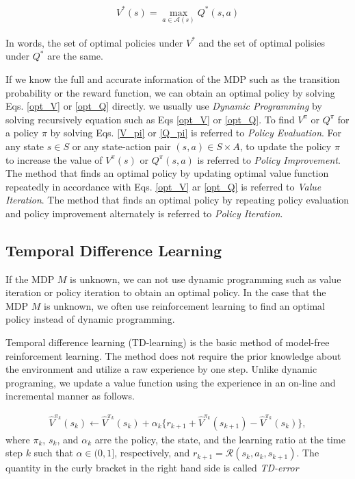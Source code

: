 \begin{align*}
  V^{\ast}(s) = \max_{a \in \mathcal{A}(s)} Q^{\ast}(s,a)
\end{align*}

In words, the set of optimal policies under $V^{\ast}$ and the set of optimal polisies under $Q^{\ast}$ are the same.

If we know the full and accurate information of the MDP such as the transition probability or the reward function, we can obtain an optimal policy by solving Eqs. \ref{opt_V} or \ref{opt_Q} directly. we usually use {\it Dynamic Programming} by solving recursively equation such as Eqs \ref{opt_V} or \ref{opt_Q}. To find $V^{\pi}$ or $Q^{\pi}$ for a policy $\pi$ by solving Eqs. \ref{V_pi} or \ref{Q_pi} is referred to {\it Policy Evaluation}. For any state $s \in S$ or any state-action pair $(s,a) \in S \times A$, to update the policy $\pi$ to increase the value of $V^{\pi}(s)$ or $Q^{\pi}(s,a)$ is referred to {\it Policy Improvement}. The method that finds an optimal policy by updating optimal value function repeatedly in accordance with Eqs. \ref{opt_V} ar \ref{opt_Q} is referred to {\it Value Iteration}. The method that finds an optimal policy by repeating policy evaluation and policy improvement alternately is referred to {\it Policy Iteration}.

\subsection{Temporal Difference Learning}

If the MDP $M$ is unknown, we can not use dynamic programming such as value iteration or policy iteration to obtain an optimal policy. In the case that the MDP $M$ is unknown, we often use   reinforcement learning to find an optimal policy instead of dynamic programming.

Temporal difference learning (TD-learning) is the basic method of model-free reinforcement learning. The method does not require the prior knowledge about the environment and utilize a raw experience by one step. Unlike dynamic programing, we update a value function using the experience in an on-line and incremental manner as follows.

\begin{align}
  \hat{V}^{\pi_k}(s_k) \leftarrow \hat{V}^{\pi_k}(s_k) + \alpha_k \{ r_{k+1} + \hat{V}^{\pi_k}(s_{k+1}) - \hat{V}^{\pi_k}(s_k) \},
\end{align}
where $\pi_k$, $s_k$, and $\alpha_k$ arre the policy, the state, and the learning ratio at the time step $k$ such that $\alpha \in (0,1]$, respectively, and $r_{k+1} = \mathcal{R}(s_k, a_k, s_{k+1})$. The quantity in the curly bracket in the right hand side is called {\it TD-error}

